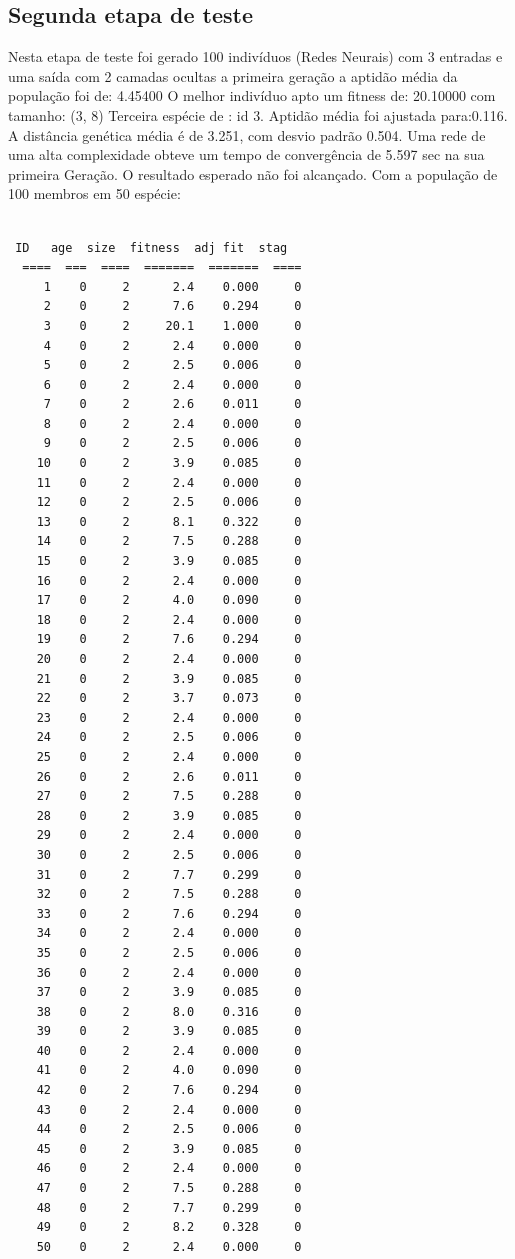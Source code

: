   
\subsection{\textbf{Segunda etapa de teste}}
Nesta etapa de teste foi gerado 100 indivíduos (Redes Neurais)
com 3 entradas e uma saída com 2 camadas ocultas
a primeira geração a aptidão média da população foi de: 4.45400 
O melhor indivíduo  apto um fitness de: 20.10000 com tamanho: (3, 8)
Terceira espécie de : id 3.
Aptidão média foi ajustada para:0.116.
A distância genética média é de 3.251, com desvio padrão 0.504.
Uma rede de uma alta complexidade obteve um tempo de convergência de 5.597 sec na sua primeira Geração.
O resultado esperado não foi alcançado. 
Com a população de 100 membros em 50 espécie:
\begin{lstlisting}

 ID   age  size  fitness  adj fit  stag
  ====  ===  ====  =======  =======  ====
     1    0     2      2.4    0.000     0
     2    0     2      7.6    0.294     0
     3    0     2     20.1    1.000     0
     4    0     2      2.4    0.000     0
     5    0     2      2.5    0.006     0
     6    0     2      2.4    0.000     0
     7    0     2      2.6    0.011     0
     8    0     2      2.4    0.000     0
     9    0     2      2.5    0.006     0
    10    0     2      3.9    0.085     0
    11    0     2      2.4    0.000     0
    12    0     2      2.5    0.006     0
    13    0     2      8.1    0.322     0
    14    0     2      7.5    0.288     0
    15    0     2      3.9    0.085     0
    16    0     2      2.4    0.000     0
    17    0     2      4.0    0.090     0
    18    0     2      2.4    0.000     0
    19    0     2      7.6    0.294     0
    20    0     2      2.4    0.000     0
    21    0     2      3.9    0.085     0
    22    0     2      3.7    0.073     0
    23    0     2      2.4    0.000     0
    24    0     2      2.5    0.006     0
    25    0     2      2.4    0.000     0
    26    0     2      2.6    0.011     0
    27    0     2      7.5    0.288     0
    28    0     2      3.9    0.085     0
    29    0     2      2.4    0.000     0
    30    0     2      2.5    0.006     0
    31    0     2      7.7    0.299     0
    32    0     2      7.5    0.288     0
    33    0     2      7.6    0.294     0
    34    0     2      2.4    0.000     0
    35    0     2      2.5    0.006     0
    36    0     2      2.4    0.000     0
    37    0     2      3.9    0.085     0
    38    0     2      8.0    0.316     0
    39    0     2      3.9    0.085     0
    40    0     2      2.4    0.000     0
    41    0     2      4.0    0.090     0
    42    0     2      7.6    0.294     0
    43    0     2      2.4    0.000     0
    44    0     2      2.5    0.006     0
    45    0     2      3.9    0.085     0
    46    0     2      2.4    0.000     0
    47    0     2      7.5    0.288     0
    48    0     2      7.7    0.299     0
    49    0     2      8.2    0.328     0
    50    0     2      2.4    0.000     0
\end{lstlisting}
